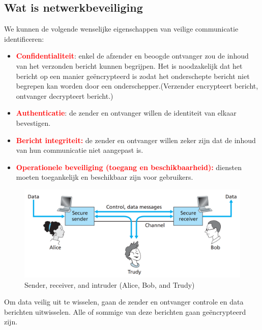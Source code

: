 \subsection{Wat is netwerkbeveiliging}
\noindent We kunnen de volgende wenselijke eigenschappen van veilige communicatie identificeren:
\begin{itemize}
    \item \textcolor{red}{\textbf{Confidentialiteit}}: enkel de afzender en beoogde ontvanger zou de inhoud van het verzonden bericht kunnen begrijpen. Het is noodzakelijk dat het bericht op een manier geëncrypteerd is zodat het onderschepte bericht niet begrepen kan worden door een onderschepper.(Verzender encrypteert bericht, ontvanger decrypteert bericht.)
    \item \textcolor{red}{\textbf{Authenticatie}}: de zender en ontvanger willen de identiteit van elkaar bevestigen.
    \item \textcolor{red}{\textbf{Bericht integriteit:}} de zender en ontvanger willen zeker zijn dat de inhoud van hun communicatie niet aangepast is.
    \item \textcolor{red}{\textbf{Operationele beveiliging (toegang en beschikbaarheid):}} diensten moeten toegankelijk en beschikbaar zijn voor gebruikers.
\end{itemize}



\begin{figure}[h]
    \centering
    \includegraphics[width=5in]{./img/imghfdst8/Figure8-1.PNG}
    \caption{Sender, receiver, and intruder (Alice, Bob, and Trudy) }      
    \label{fig:Sender, receiver, and intruder (Alice, Bob, and Trudy) }
\end{figure}
\noindent Om data veilig uit te wisselen, gaan de zender en ontvanger controle en data berichten uitwisselen. Alle of sommige van deze berichten gaan geëncrypteerd zijn. 

